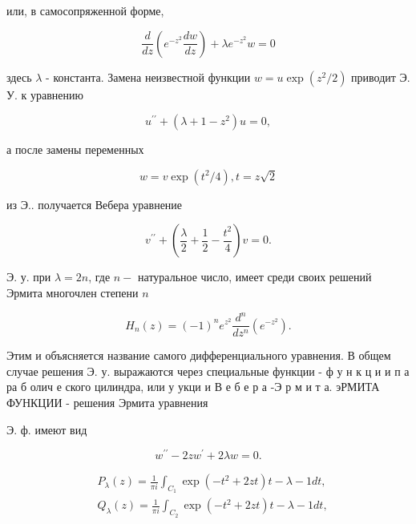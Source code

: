 \documentclass[10pt]{article}
\begin{document}
или, в самосопряженной форме,



\[

\frac{d}{d z}\left(e^{-z^{2}} \frac{d w}{d z}\right)+\lambda e^{-z^{2}} w=0

\]



здесь $\lambda$ - константа. Замена неизвестной функции $w=u \exp \left(z^{2} / 2\right)$ приводит Э. У. к уравнению



\[

u^{\prime \prime}+\left(\lambda+1-z^{2}\right) u=0,

\]



а после замены переменных



\[

w=v \exp \left(t^{2} / 4\right), t=z \sqrt{2}

\]



из Э.. получается Вебера уравнение



\[

v^{\prime \prime}+\left(\frac{\lambda}{2}+\frac{1}{2}-\frac{t^{2}}{4}\right) v=0 .

\]



Э. у. при $\lambda=2 n$, где $n-$ натуральное число, имеет среди своих решений Эрмита многочлен степени $n$



\[

H_{n}(z)=(-1)^{n} e^{z^{2}} \frac{d^{n}}{d z^{n}}\left(e^{-z^{2}}\right) .

\]



Этим и объясняется название самого дифференциального уравнения. В общем случае решения Э. у. выражаются через специальные функции - ф у н к ц и и п а ра б олич е ского цилиндра, или у укци и В е б е р а -Э р м и т а. эРМИТА ФУНКЦИИ - решения Эрмита уравнения



Э. ф. имеют вид



\[

w^{\prime \prime}-2 z w^{\prime}+2 \lambda w=0 .

\]



\[

\begin{aligned}

& P_{\lambda}(z)=\frac{1}{\pi i} \int_{C_{1}} \exp \left(-t^{2}+2 z t\right) t-\lambda-1 d t, \\

& Q_{\lambda}(z)=\frac{1}{\pi i} \int_{C_{2}} \exp \left(-t^{2}+2 z t\right) t-\lambda-1 d t,

\end{aligned}

\]
\end{document}
